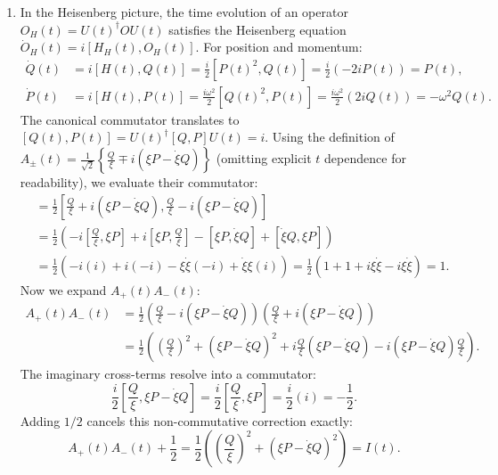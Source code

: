 \documentclass{article}
\begin{document}
\begin{enumerate}[label=\fbox{\arabic*}]
\begin{enumerate}[label=(\roman*)]
          \item In the Heisenberg picture, the time evolution of an operator $O_H(t) = U(t)^\dagger O U(t)$ satisfies the Heisenberg equation $\dot{O}_H(t) = i[H_H(t), O_H(t)]$.
          For position and momentum:
          \begin{align*}
            \dot{Q}(t) &= i[H(t), Q(t)] = \frac{i}{2} [P(t)^2, Q(t)] = \frac{i}{2} (-2i P(t)) = P(t), \\
            \dot{P}(t) &= i[H(t), P(t)] = \frac{i \omega^2}{2} [Q(t)^2, P(t)] = \frac{i \omega^2}{2} (2i Q(t)) = -\omega^2 Q(t).
          \end{align*}
          The canonical commutator translates to $[Q(t), P(t)] = U(t)^\dagger [Q, P] U(t) = i$.
          Using the definition of $A_\pm(t) = \frac{1}{\sqrt{2}} \left\{ \frac{Q}{\xi} \mp i (\xi P - \dot{\xi} Q) \right\}$ (omitting explicit $t$ dependence for readability), we evaluate their commutator:
          \begin{align*}
            [A_-(t), A_+(t)] &= \frac{1}{2} \left[ \frac{Q}{\xi} + i (\xi P - \dot{\xi} Q), \frac{Q}{\xi} - i (\xi P - \dot{\xi} Q) \right] \\
            &= \frac{1}{2} \left( -i \left[ \frac{Q}{\xi}, \xi P \right] + i \left[ \xi P, \frac{Q}{\xi} \right] - \left[ \xi P, \dot{\xi} Q \right] + \left[ \dot{\xi} Q, \xi P \right] \right) \\
            &= \frac{1}{2} \left( -i(i) + i(-i) - \xi\dot{\xi}(-i) + \dot{\xi}\xi(i) \right) = \frac{1}{2} (1 + 1 + i\xi\dot{\xi} - i\xi\dot{\xi}) = 1.
          \end{align*}
          Now we expand $A_+(t)A_-(t)$:
          \begin{align*}
            A_+(t)A_-(t) &= \frac{1}{2} \left( \frac{Q}{\xi} - i (\xi P - \dot{\xi} Q) \right) \left( \frac{Q}{\xi} + i (\xi P - \dot{\xi} Q) \right) \\
            &= \frac{1}{2} \left( \left(\frac{Q}{\xi}\right)^2 + (\xi P - \dot{\xi} Q)^2 + i \frac{Q}{\xi}(\xi P - \dot{\xi} Q) - i (\xi P - \dot{\xi} Q)\frac{Q}{\xi} \right).
          \end{align*}
          The imaginary cross-terms resolve into a commutator:
          \[
            \frac{i}{2} \left[ \frac{Q}{\xi}, \xi P - \dot{\xi} Q \right] = \frac{i}{2} \left[ \frac{Q}{\xi}, \xi P \right] = \frac{i}{2} (i) = -\frac{1}{2}.
          \]
          Adding $1/2$ cancels this non-commutative correction exactly:
          \[
            A_+(t)A_-(t) + \frac{1}{2} = \frac{1}{2} \left( \left(\frac{Q}{\xi}\right)^2 + (\xi P - \dot{\xi} Q)^2 \right) = I(t).
\]
\end{enumerate}
\end{enumerate}
\end{document}
